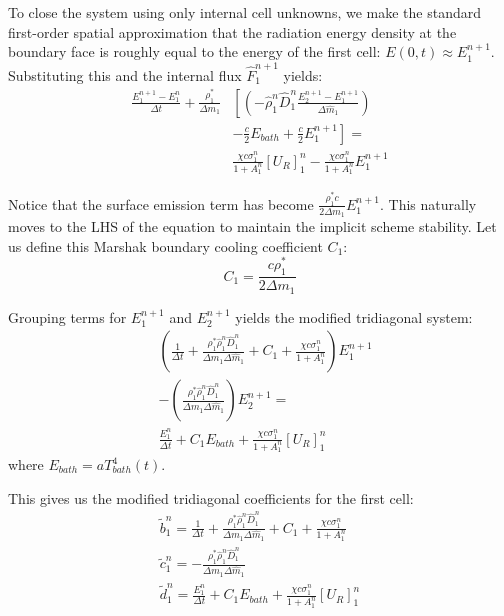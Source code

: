 \documentclass[11pt]{article}
\begin{document}
To close the system using only internal cell unknowns, we make the standard first-order spatial approximation that the radiation energy density at the boundary face is roughly equal to the energy of the first cell: $E(0,t) \approx E_1^{n+1}$. Substituting this and the internal flux $\hat{F}_1^{n+1}$ yields:
\begin{equation}
\begin{aligned}
    \frac{E_1^{n+1} - E_1^n}{\Delta t} + \frac{\rho_1^*}{\Delta m_1} & \left[ \left( -\hat{\rho}_1^n \hat{D}_1^n \frac{E_2^{n+1} - E_1^{n+1}}{\Delta \hat{m}_1} \right) \right. \\
    & \left. - \frac{c}{2} E_{bath} + \frac{c}{2} E_1^{n+1} \right] = \\
    & \frac{\chi c \sigma_1^n}{1 + A_1^n} [U_R]_1^n - \frac{\chi c \sigma_1^n}{1 + A_1^n} E_1^{n+1}
\end{aligned}
\end{equation}

Notice that the surface emission term has become $\frac{\rho_1^* c}{2\Delta m_1} E_1^{n+1}$. This naturally moves to the LHS of the equation to maintain the implicit scheme stability. Let us define this Marshak boundary cooling coefficient $C_1$:
\begin{equation}
    C_1 = \frac{c \rho_1^*}{2 \Delta m_1}
\end{equation}

Grouping terms for $E_1^{n+1}$ and $E_2^{n+1}$ yields the modified tridiagonal system:
\begin{equation}
\begin{aligned}
    & \left( \frac{1}{\Delta t} + \frac{\rho_1^* \hat{\rho}_1^n \hat{D}_1^n}{\Delta m_1 \Delta \hat{m}_1} + C_1 + \frac{\chi c \sigma_1^n}{1 + A_1^n} \right)E_1^{n+1} \\
    & - \left( \frac{\rho_1^* \hat{\rho}_1^n \hat{D}_1^n}{\Delta m_1 \Delta \hat{m}_1} \right)E_2^{n+1} = \\
    & \frac{E_1^n}{\Delta t} + C_1 E_{bath} + \frac{\chi c \sigma_1^n}{1 + A_1^n} [U_R]_1^n
\end{aligned}
\end{equation}
where $E_{bath} = a T_{bath}^4(t)$. 

This gives us the modified tridiagonal coefficients for the first cell: 
\begin{gather}
    \boxed{ \tilde{b}_1^n = \frac{1}{\Delta t} + \frac{\rho_1^* \hat{\rho}_1^n \hat{D}_1^n}{\Delta m_1 \Delta \hat{m}_1} + C_1 + \frac{\chi c \sigma_{1}^{n}}{1 + A_{1}^n} } \\
    \boxed{ \tilde{c}_1^n = -\frac{\rho_1^* \hat{\rho}_1^n \hat{D}_1^n}{\Delta m_1 \Delta \hat{m}_1} } \\
    \boxed{ \tilde{d}_1^n = \frac{E_1^n}{\Delta t} + C_1 E_{bath} + \frac{\chi c \sigma_{1}^{n}}{1 + A_{1}^n} [U_R]_{1}^n }
\end{gather}
\end{document}
